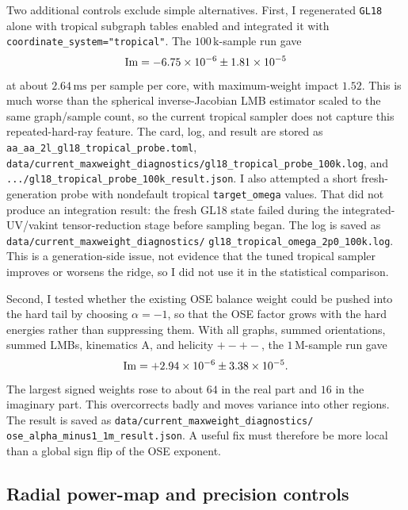 \documentclass[11pt]{article}
\begin{document}
Two additional controls exclude simple alternatives.  First, I regenerated
\texttt{GL18} alone with tropical subgraph tables enabled and integrated it
with \texttt{coordinate\_system="tropical"}.  The \(100\,\mathrm{k}\)-sample
run gave
\[
  {\rm Im}=-6.75\times10^{-6}\pm1.81\times10^{-5}
\]
at about \(2.64\,\mathrm{ms}\) per sample per core, with maximum-weight impact
\(1.52\).  This is much worse than the spherical inverse-Jacobian LMB
estimator scaled to the same graph/sample count, so the current tropical
sampler does not capture this repeated-hard-ray feature.  The card, log, and
result are stored as
\texttt{aa\_aa\_2l\_gl18\_tropical\_probe.toml},
\texttt{data/current\_maxweight\_diagnostics/gl18\_tropical\_probe\_100k.log},
and \texttt{.../gl18\_tropical\_probe\_100k\_result.json}.
I also attempted a short fresh-generation probe with nondefault tropical
\texttt{target\_omega} values.  That did not produce an integration result: the
fresh GL18 state failed during the integrated-UV/vakint tensor-reduction stage
before sampling began.  The log is saved as
\texttt{data/current\_maxweight\_diagnostics/}
\texttt{gl18\_tropical\_omega\_2p0\_100k.log}.  This is a generation-side issue,
not evidence that the tuned tropical sampler improves or worsens the ridge, so
I did not use it in the statistical comparison.

Second, I tested whether the existing OSE balance weight could be pushed into
the hard tail by choosing \(\alpha=-1\), so that the OSE factor grows with the
hard energies rather than suppressing them.  With all graphs, summed
orientations, summed LMBs, kinematics A, and helicity \(+-+-\), the
\(1\,\mathrm{M}\)-sample run gave
\[
  {\rm Im}=+2.94\times10^{-6}\pm3.38\times10^{-5}.
\]
The largest signed weights rose to about \(64\) in the real part and \(16\) in
the imaginary part.  This overcorrects badly and moves variance into other
regions.  The result is saved as
\texttt{data/current\_maxweight\_diagnostics/}
\texttt{ose\_alpha\_minus1\_1m\_result.json}.  A useful fix must therefore be
more local than a global sign flip of the OSE exponent.

\subsection{Radial power-map and precision controls}
\end{document}
